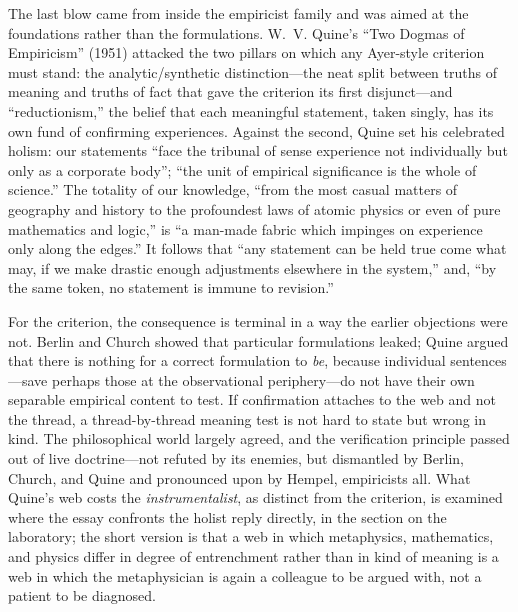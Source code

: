 The last blow came from inside the empiricist family and was aimed at the foundations rather than the formulations. W.~V. Quine's ``Two Dogmas of Empiricism'' (1951) attacked the two pillars on which any Ayer-style criterion must stand: the analytic/synthetic distinction---the neat split between truths of meaning and truths of fact that gave the criterion its first disjunct---and ``reductionism,'' the belief that each meaningful statement, taken singly, has its own fund of confirming experiences. Against the second, Quine set his celebrated holism: our statements ``face the tribunal of sense experience not individually but only as a corporate body''; ``the unit of empirical significance is the whole of science.'' The totality of our knowledge, ``from the most casual matters of geography and history to the profoundest laws of atomic physics or even of pure mathematics and logic,'' is ``a man-made fabric which impinges on experience only along the edges.'' It follows that ``any statement can be held true come what may, if we make drastic enough adjustments elsewhere in the system,'' and, ``by the same token, no statement is immune to revision.''

For the criterion, the consequence is terminal in a way the earlier objections were not. Berlin and Church showed that particular formulations leaked; Quine argued that there is nothing for a correct formulation to \emph{be}, because individual sentences---save perhaps those at the observational periphery---do not have their own separable empirical content to test. If confirmation attaches to the web and not the thread, a thread-by-thread meaning test is not hard to state but wrong in kind. The philosophical world largely agreed, and the verification principle passed out of live doctrine---not refuted by its enemies, but dismantled by Berlin, Church, and Quine and pronounced upon by Hempel, empiricists all. What Quine's web costs the \emph{instrumentalist}, as distinct from the criterion, is examined where the essay confronts the holist reply directly, in the section on the laboratory; the short version is that a web in which metaphysics, mathematics, and physics differ in degree of entrenchment rather than in kind of meaning is a web in which the metaphysician is again a colleague to be argued with, not a patient to be diagnosed.

